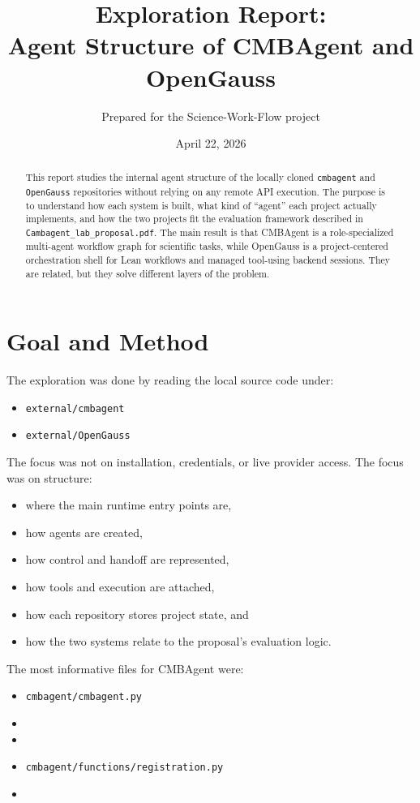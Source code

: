 \documentclass[11pt,a4paper]{article}
\title{Exploration Report:\\Agent Structure of CMBAgent and OpenGauss}
\author{Prepared for the Science-Work-Flow project}
\date{April 22, 2026}
\begin{document}
\maketitle

\begin{abstract}
This report studies the internal agent structure of the locally cloned
\texttt{cmbagent} and \texttt{OpenGauss} repositories without relying on any
remote API execution. The purpose is to understand how each system is built,
what kind of ``agent'' each project actually implements, and how the two
projects fit the evaluation framework described in
\texttt{Cambagent\_lab\_proposal.pdf}. The main result is that CMBAgent is a
role-specialized multi-agent workflow graph for scientific tasks, while
OpenGauss is a project-centered orchestration shell for Lean workflows and
managed tool-using backend sessions. They are related, but they solve different
layers of the problem.
\end{abstract}

\section{Goal and Method}
The exploration was done by reading the local source code under:
\begin{itemize}[leftmargin=1.5em]
\item \texttt{external/cmbagent}
\item \texttt{external/OpenGauss}
\end{itemize}

The focus was not on installation, credentials, or live provider access. The
focus was on structure:
\begin{itemize}[leftmargin=1.5em]
\item where the main runtime entry points are,
\item how agents are created,
\item how control and handoff are represented,
\item how tools and execution are attached,
\item how each repository stores project state, and
\item how the two systems relate to the proposal's evaluation logic.
\end{itemize}

The most informative files for CMBAgent were:
\begin{itemize}[leftmargin=1.5em]
\item \texttt{cmbagent/cmbagent.py}
\item {}
\item {}
\item \texttt{cmbagent/functions/registration.py}
\item {}
\end{itemize}
\end{document}
